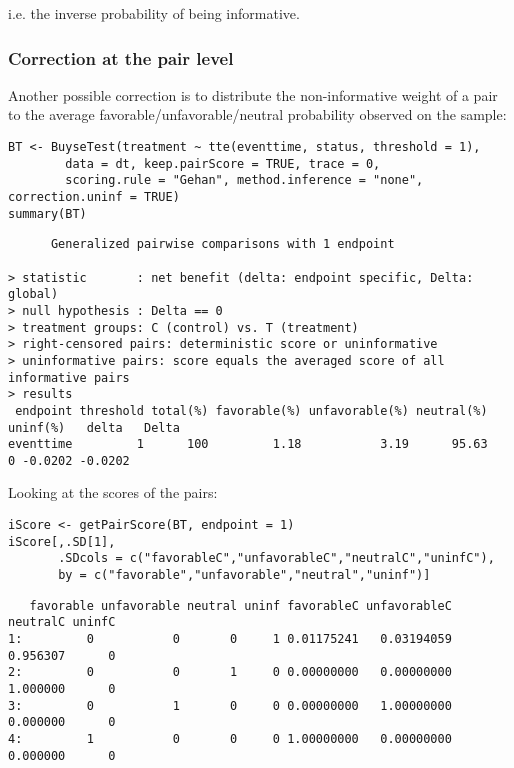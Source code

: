 \documentclass[12pt]{article}
\begin{document}
i.e. the inverse probability of being informative. 

\subsubsection{Correction at the pair level}
\label{sec:orgd2e074d}

Another possible correction is to distribute the non-informative
weight of a pair to the average favorable/unfavorable/neutral
probability observed on the sample:
\lstset{language=r,label= ,caption= ,captionpos=b,numbers=none}
\begin{lstlisting}
BT <- BuyseTest(treatment ~ tte(eventtime, status, threshold = 1),
		data = dt, keep.pairScore = TRUE, trace = 0,
		scoring.rule = "Gehan", method.inference = "none", correction.uninf = TRUE)
summary(BT)
\end{lstlisting}

\begin{verbatim}
      Generalized pairwise comparisons with 1 endpoint

> statistic       : net benefit (delta: endpoint specific, Delta: global) 
> null hypothesis : Delta == 0 
> treatment groups: C (control) vs. T (treatment) 
> right-censored pairs: deterministic score or uninformative
> uninformative pairs: score equals the averaged score of all informative pairs
> results
 endpoint threshold total(%) favorable(%) unfavorable(%) neutral(%) uninf(%)   delta   Delta
eventtime         1      100         1.18           3.19      95.63        0 -0.0202 -0.0202
\end{verbatim}


Looking at the scores of the pairs:
\lstset{language=r,label= ,caption= ,captionpos=b,numbers=none}
\begin{lstlisting}
iScore <- getPairScore(BT, endpoint = 1)
iScore[,.SD[1], 
       .SDcols = c("favorableC","unfavorableC","neutralC","uninfC"),
       by = c("favorable","unfavorable","neutral","uninf")]
\end{lstlisting}

\begin{verbatim}
   favorable unfavorable neutral uninf favorableC unfavorableC neutralC uninfC
1:         0           0       0     1 0.01175241   0.03194059 0.956307      0
2:         0           0       1     0 0.00000000   0.00000000 1.000000      0
3:         0           1       0     0 0.00000000   1.00000000 0.000000      0
4:         1           0       0     0 1.00000000   0.00000000 0.000000      0
\end{verbatim}
\end{document}

